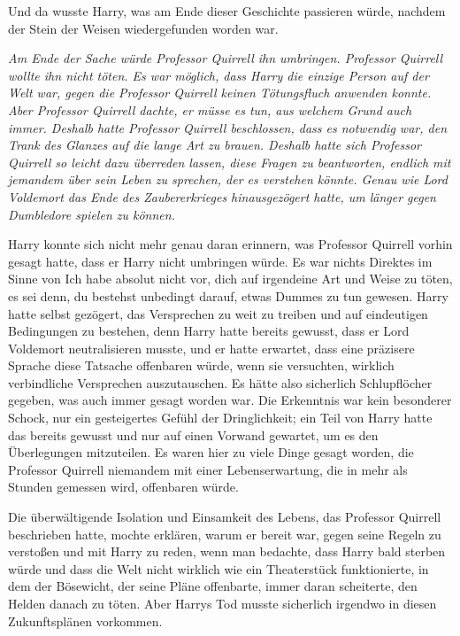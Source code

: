 Und da wusste Harry, was am Ende dieser Geschichte passieren würde, nachdem der
Stein der Weisen wiedergefunden worden war.

\emph{Am Ende der Sache würde Professor Quirrell ihn umbringen. Professor
Quirrell wollte ihn nicht töten. Es war möglich, dass Harry die einzige Person
auf der Welt war, gegen die Professor Quirrell keinen Tötungsfluch anwenden
konnte. Aber Professor Quirrell dachte, er müsse es tun, aus welchem Grund auch
immer. Deshalb hatte Professor Quirrell beschlossen, dass es notwendig war, den
Trank des Glanzes auf die lange Art zu brauen. Deshalb hatte sich Professor
Quirrell so leicht dazu überreden lassen, diese Fragen zu beantworten, endlich
mit jemandem über sein Leben zu sprechen, der es verstehen könnte. Genau wie
Lord Voldemort das Ende des Zaubererkrieges hinausgezögert hatte, um länger
gegen Dumbledore spielen zu können.}

Harry konnte sich nicht mehr genau daran erinnern, was Professor Quirrell vorhin
gesagt hatte, dass er Harry nicht umbringen würde. Es war nichts Direktes im
Sinne von \glqq{}Ich habe absolut nicht vor, dich auf irgendeine Art und Weise zu
töten, es sei denn, du bestehst unbedingt darauf, etwas Dummes zu tun\grqq{}
gewesen. Harry hatte selbst gezögert, das Versprechen zu weit zu treiben und auf
eindeutigen Bedingungen zu bestehen, denn Harry hatte bereits gewusst, dass er
Lord Voldemort neutralisieren musste, und er hatte erwartet, dass eine präzisere
Sprache diese Tatsache offenbaren würde, wenn sie versuchten, wirklich
verbindliche Versprechen auszutauschen. Es hätte also sicherlich Schlupflöcher
gegeben, was auch immer gesagt worden war. Die Erkenntnis war kein besonderer
Schock, nur ein gesteigertes Gefühl der Dringlichkeit; ein Teil von Harry hatte
das bereits gewusst und nur auf einen Vorwand gewartet, um es den Überlegungen
mitzuteilen. Es waren hier zu viele Dinge gesagt worden, die Professor Quirrell
niemandem mit einer Lebenserwartung, die in mehr als Stunden gemessen wird,
offenbaren würde.

Die überwältigende Isolation und Einsamkeit des Lebens, das Professor Quirrell
beschrieben hatte, mochte erklären, warum er bereit war, gegen seine Regeln zu
verstoßen und mit Harry zu reden, wenn man bedachte, dass Harry bald sterben
würde und dass die Welt nicht wirklich wie ein Theaterstück funktionierte, in
dem der Bösewicht, der seine Pläne offenbarte, immer daran scheiterte, den
Helden danach zu töten. Aber Harrys Tod musste sicherlich irgendwo in diesen
Zukunftsplänen vorkommen.

